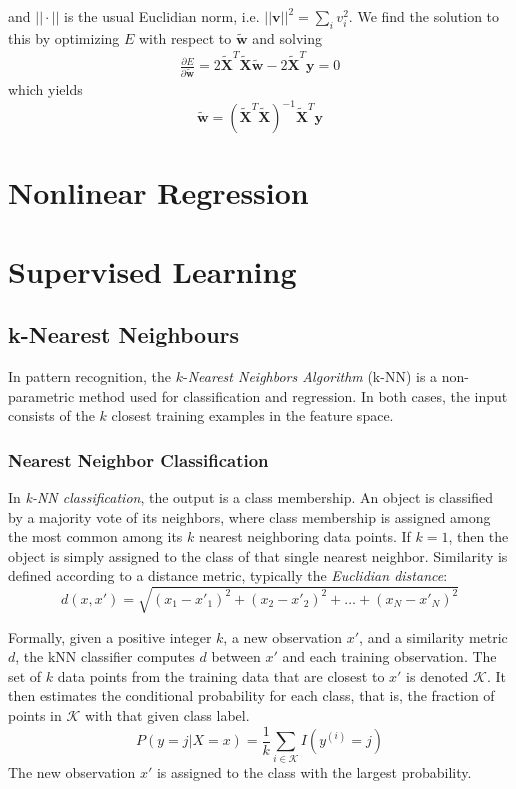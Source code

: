 \documentclass[11pt]{article}
\theoremstyle{plain}
\theoremstyle{definition}
\begin{document}
and $||\cdot||$ is the usual Euclidian norm, i.e. $||\textbf{v}||^2=\sum_i v_i^2$. We find the solution to this by optimizing $E$ with respect to $\tilde{\textbf{w}}$ and solving
\begin{align}
\frac{\partial E}{\partial \tilde{\textbf{w}}} = 2 \tilde{\textbf{X}}^T \tilde{\textbf{X}} \tilde{\textbf{w}} -2 \tilde{\textbf{X}}^T \textbf{y} = 0 
\end{align}
which yields
\begin{equation}
 \tilde{\textbf{w}}  = (\tilde{\textbf{X}}^T \tilde{\textbf{X}})^{-1} \tilde{\textbf{X}}^T \textbf{y}
\end{equation}


\section{Nonlinear Regression}

\section{Supervised Learning}
\subsection{k-Nearest Neighbours}
In pattern recognition, the $k$-\textit{Nearest Neighbors Algorithm} (k-NN) is a non-parametric method used for classification and regression. In both cases, the input consists of the $k$ closest training examples in the feature space. 

\subsubsection{Nearest Neighbor Classification}
In \textit{k-NN classification}, the output is a class membership. An object is classified by a majority vote of its neighbors, where class membership is assigned among the most common among its $k$ nearest neighboring data points. If $k = 1$, then the object is simply assigned to the class of that single nearest neighbor. Similarity is defined according to a distance metric, typically the \textit{Euclidian distance}:
\begin{equation}
d(x,x')=\sqrt{(x_1-x'_1)^2 + (x_2-x'_2)^2 + \dots + (x_N-x'_N)^2}
\end{equation}

Formally, given a positive integer $k$, a new observation $x'$, and a similarity metric $d$, the kNN classifier computes $d$ between $x'$ and each training observation. The set of $k$ data points from the training data that are closest to $x'$ is denoted $\mathcal{K}$. It then estimates the conditional probability for each class, that is, the fraction of points in $\mathcal{K}$ with that given class label.
\begin{equation}
P(y=j|X=x) = \frac{1}{k} \sum_{i \in \mathcal{K}} I(y^{(i)}=j)
\end{equation}
The new observation $x'$ is assigned to the class with the largest probability.
\end{document}
